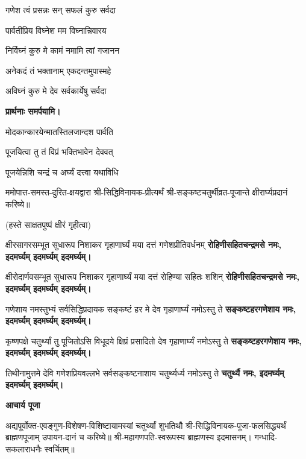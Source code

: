 \begin{center}
{गणेश त्वं प्रसन्नः सन् सफलं कुरु सर्वदा}

{पार्वतीप्रिय विघ्नेश मम विघ्नान्निवारय} 

{निर्विघ्नं कुरु मे कामं नमामि त्वां गजानन}

{अनेकदं तं भक्तानाम् एकदन्तमुपास्महे}

{अविघ्नं कुरु मे देव सर्वकार्येषु सर्वदा}

\textbf{प्रार्थनाः समर्पयामि।}

{मोदकान्कारयेन्मातस्तिलजान्दश पार्वति}

{पूजयित्वा तु तं विप्रं भक्तिभावेन देववत्}

{पूजयेन्निशि चन्द्रं च अर्घ्यं दत्त्वा यथाविधि}


\resetShloka
ममोपात्त-समस्त-दुरित-क्षयद्वारा श्री-सिद्धिविनायक-प्रीत्यर्थं श्री-सङ्कष्टचतुर्थीव्रत-पूजान्ते क्षीरार्घ्यप्रदानं करिष्ये॥

(हस्ते साक्षतपुष्पं क्षीरं गृहीत्वा)

\twolineshloka
{क्षीरसागरसम्भूत सुधारूप निशाकर}
{गृहाणार्घ्यं मया दत्तं गणेशप्रीतिवर्धनम्}
\textbf{रोहिणीसहितचन्द्रमसे नमः, इदमर्घ्यम् इदमर्घ्यम् इदमर्घ्यम्।}

\twolineshloka
{क्षीरोदार्णवसम्भूत सुधारूप निशाकर}
{गृहाणार्घ्यं मया दत्तं रोहिण्या सहितः शशिन्}
\textbf{रोहिणीसहितचन्द्रमसे नमः, इदमर्घ्यम् इदमर्घ्यम् इदमर्घ्यम्।}

\twolineshloka
{गणेशाय नमस्तुभ्यं सर्वसिद्धिप्रदायक}
{सङ्कष्टं हर मे देव गृहाणार्घ्यं नमोऽस्तु ते}
\textbf{सङ्कष्टहरगणेशाय नमः, इदमर्घ्यम् इदमर्घ्यम् इदमर्घ्यम्।}

\twolineshloka
{कृष्णपक्षे चतुर्थ्यां तु पूजितोऽसि विधूदये}
{क्षिप्रं प्रसादितो देव गृहाणार्घ्यं नमोऽस्तु ते}
\textbf{सङ्कष्टहरगणेशाय नमः, इदमर्घ्यम् इदमर्घ्यम् इदमर्घ्यम्।}

\twolineshloka
{तिथीनामुत्तमे देवि गणेशप्रियवल्लभे}
{सर्वसङ्कष्टनाशाय चतुर्थ्यर्ध्य नमोऽस्तु ते}
\textbf{चतुर्थ्यै नमः, इदमर्घ्यम् इदमर्घ्यम् इदमर्घ्यम्।}


\centerline{\textbf{आचार्य पूजा}}

अद्यपूर्वोक्त-एवङ्गुण-विशेषण-विशिष्टायामस्यां चतुर्थ्यां शुभतिथौ श्री-सिद्धिविनायक-पूजा-फलसिद्ध्यर्थं ब्राह्मणपूजाम् उपायन-दानं च करिष्ये॥ 
श्री-महागणपति-स्वरूपस्य ब्राह्मणस्य इदमासनम्। गन्धादि-सकलाराधनैः स्वर्चितम्॥


\end{center}
